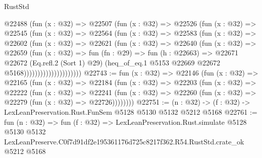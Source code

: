 \begin{lexlean}{RustStd}
\begin{coremodule}
                      @22488
                        (fun (x : @32) =>
                        @22507
                          (fun (x : @32) =>
                          @22526
                            (fun (x : @32) =>
                            @22545
                              (fun (x : @32) =>
                              @22564
                                (fun (x : @32) =>
                                @22583
                                  (fun (x : @32) =>
                                  @22602
                                    (fun (x : @32) =>
                                    @22621
                                      (fun (x : @32) =>
                                      @22640
                                        (fun (x : @32) =>
                                        @22659
                                          (fun (x : @32) =>
                                          fun (fn : @29) =>
                                          fun (h : @22663) =>
                                          @22671
                                            @22672
                                            (Eq.refl.{2} (Sort 1) @29)
                                            (heq_of_eq.{1}
                                              @5153
                                              @22669
                                              @22672
                                              @5168)))))))))))))))))))))
@22743 := fun (x : @32) =>
  @22146
    (fun (x : @32) =>
    @22165
      (fun (x : @32) =>
      @22184
        (fun (x : @32) =>
        @22203
          (fun (x : @32) =>
          @22222
            (fun (x : @32) =>
            @22241
              (fun (x : @32) => @22260 (fun (x : @32) => @22279 (fun (x : @32) => @22726))))))))
@22751 := (n : @32) -> (f : @32) -> LexLeanPreservation.Rust.FunSem @5128 @5130 @5132 @5212 @5168
@22761 := fun (n : @32) =>
  fun (f : @32) =>
  LexLeanPreservation.Rust.simulate
    @5128
    @5130
    @5132
    LexLeanPreserve.C0f7d91df2e195361176d725c8217f362.R54.RustStd.crate_ok
    @5212
    @5168
\end{coremodule}
\end{lexlean}
